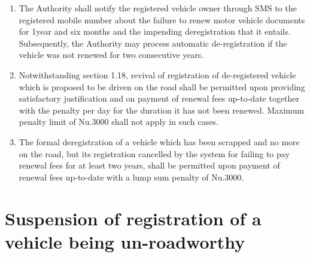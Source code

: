 \documentclass[
]{book}
\providecommand{\tightlist}{%
  \setlength{\itemsep}{0pt}\setlength{\parskip}{0pt}}
\begin{document}
\begin{enumerate}
\def\labelenumi{\alph{enumi}.}
\tightlist
\item
  The Authority shall notify the registered vehicle owner through SMS to the registered mobile number about the failure to renew motor vehicle documents for 1year and six months and the impending deregistration that it entails. Subsequently, the Authority may process automatic de-registration if the vehicle was not renewed for two consecutive years.
\item
  Notwithstanding section 1.18, revival of registration of de-registered vehicle which is proposed to be driven on the road shall be permitted upon providing satisfactory justification and on payment of renewal fees up-to-date together with the penalty \citet{Nu.10} per day for the duration it has not been renewed. Maximum penalty limit of Nu.3000 shall not apply in such cases.
\item
  The formal deregistration of a vehicle which has been scrapped and no more on the road, but its registration cancelled by the system for failing to pay renewal fees for at least two years, shall be permitted upon payment of renewal fees up-to-date with a lump sum penalty of Nu.3000.
\end{enumerate}

\hypertarget{suspension-of-registration-of-a-vehicle-being-un-roadworthy}{%
\section{Suspension of registration of a vehicle being un-roadworthy}\label{suspension-of-registration-of-a-vehicle-being-un-roadworthy}}
\end{document}
